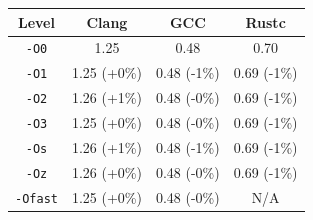\begin{tabular*}{\columnwidth}{@{\extracolsep\fill}cccc@{\extracolsep\fill}}
\toprule
\textbf{Level} & \textbf{Clang} & \textbf{GCC} & \textbf{Rustc} \\
\midrule
\texttt{-O0} & 1.25 & 0.48 & 0.70 \\
\texttt{-O1} & 1.25 (+0\%) & 0.48 (-1\%) & 0.69 (-1\%) \\
\texttt{-O2} & 1.26 (+1\%) & 0.48 (-0\%) & 0.69 (-1\%) \\
\texttt{-O3} & 1.25 (+0\%) & 0.48 (-0\%) & 0.69 (-1\%) \\
\texttt{-Os} & 1.26 (+1\%) & 0.48 (-1\%) & 0.69 (-1\%) \\
\texttt{-Oz} & 1.26 (+0\%) & 0.48 (-0\%) & 0.69 (-1\%) \\
\texttt{-Ofast} & 1.25 (+0\%) & 0.48 (-0\%) & N/A \\
\bottomrule
\end{tabular*}
